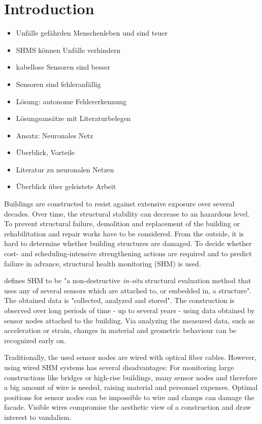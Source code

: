\documentclass[12pt]{scrartcl}
\begin{document}
\section*{Introduction}

\begin{itemize}
\item Unfälle gefährden Menschenleben und sind teuer
\item SHMS können Unfälle verhindern
\item kabellose Sensoren sind besser
\item Sensoren sind fehleranfällig
\item Lösung: autonome Fehlererkennung 
\item Lösungsansätze mit Literaturbelegen
\item Ansatz: Neuronales Netz
\item Überblick, Vorteile
\item Literatur zu neuronalen Netzen
\item Überblick über geleistete Arbeit
\end{itemize}

\newpage

Buildings are constructed to resist against extensive exposure over several decades. 
Over time, the structural stability can decrease to an hazardous level. 
To prevent structural failure, demolition and replacement of the building or rehabilitation and repair works have to be considered.
From the outside, it is hard to determine whether building structures are damaged.
To decide whether cost- and scheduling-intensive strengthening actions are required and to predict failure in advance, structural health monitoring (SHM) is used.

\cite[4]{BisbySHM} defines SHM to be "a non-destructive \textit{in-situ} structural evaluation method that uses any of several sensors which are attached to, or embedded in, a structure". The obtained data is "collected, analyzed and stored".
The construction is observed over long periods of time - up to several years - using data obtained by sensor nodes attached to the building.
Via analyzing the measured data, such as acceleration or strain, changes in material and geometric behaviour can be recognized early on.

Traditionally, the used sensor nodes are wired with optical fiber cables. 
However, using wired SHM systems has several disadvantages: 
For monitoring large constructions like bridges or high-rise buildings, many sensor nodes and therefore a big amount of wire is needed, raising material and personnel expenses.
Optimal positions for sensor nodes can be impossible to wire and clamps can damage the facade. 
Visible wires compromise the aesthetic view of a construction and draw interest to vandalism.
\end{document}
